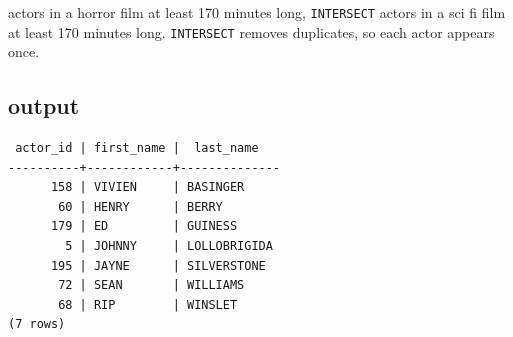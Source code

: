 \documentclass[11pt]{article}
\begin{document}
actors in a horror film at least 170 minutes long, \texttt{INTERSECT} actors in a sci fi film
at least 170 minutes long. \texttt{INTERSECT} removes duplicates, so each actor appears once.

\subsection*{output}
{\small
\begin{verbatim}
 actor_id | first_name |  last_name
----------+------------+--------------
      158 | VIVIEN     | BASINGER
       60 | HENRY      | BERRY
      179 | ED         | GUINESS
        5 | JOHNNY     | LOLLOBRIGIDA
      195 | JAYNE      | SILVERSTONE
       72 | SEAN       | WILLIAMS
       68 | RIP        | WINSLET
(7 rows)
\end{verbatim}
}
\end{document}
